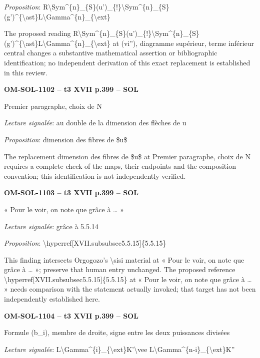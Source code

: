 \emph{Proposition}: R\textbackslash{}Sym\textasciicircum{}\{n\}\_\{S\}(u')\_\{!\}\textbackslash{}Sym\textasciicircum{}\{n\}\_\{S\}(g')\textasciicircum{}\{\textbackslash{}ast\}L\textbackslash{}Gamma\textasciicircum{}\{n\}\_\{\textbackslash{}ext\}\par
The proposed reading R\textbackslash{}Sym\textasciicircum{}\{n\}\_\{S\}(u')\_\{!\}\textbackslash{}Sym\textasciicircum{}\{n\}\_\{S\}(g')\textasciicircum{}\{\textbackslash{}ast\}L\textbackslash{}Gamma\textasciicircum{}\{n\}\_\{\textbackslash{}ext\} at (vi''), diagramme supérieur, terme inférieur central changes a substantive mathematical assertion or bibliographic identification; no independent derivation of this exact replacement is established in this review.\par
\par\noindent\textbf{OM-SOL-1102 -- t3 XVII p.399 -- SOL}\par
Premier paragraphe, choix de N\par
\emph{Lecture signalée}: au double de la dimension des flèches de u\par
\emph{Proposition}: dimension des fibres de \$u\$\par
The replacement dimension des fibres de \$u\$ at Premier paragraphe, choix de N requires a complete check of the maps, their endpoints and the composition convention; this identification is not independently verified.\par
\par\noindent\textbf{OM-SOL-1103 -- t3 XVII p.399 -- SOL}\par
« Pour le voir, on note que grâce à … »\par
\emph{Lecture signalée}: grâce à 5.5.14\par
\emph{Proposition}: \textbackslash{}hyperref[XVII.subsubsec5.5.15]\{5.5.15\}\par
This finding intersects Orgogozo's \textbackslash{}sisi material at « Pour le voir, on note que grâce à … »; preserve that human entry unchanged. The proposed reference \textbackslash{}hyperref[XVII.subsubsec5.5.15]\{5.5.15\} at « Pour le voir, on note que grâce à … » needs comparison with the statement actually invoked; that target has not been independently established here.\par
\par\noindent\textbf{OM-SOL-1104 -- t3 XVII p.399 -- SOL}\par
Formule (b\_i), membre de droite, signe entre les deux puissances divisées\par
\emph{Lecture signalée}: L\textbackslash{}Gamma\textasciicircum{}\{i\}\_\{\textbackslash{}ext\}K'\textbackslash{}vee L\textbackslash{}Gamma\textasciicircum{}\{n-i\}\_\{\textbackslash{}ext\}K''\par
